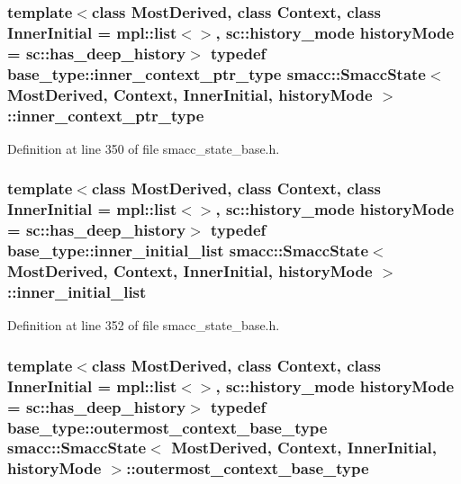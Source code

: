\subsubsection[{\texorpdfstring{inner\+\_\+context\+\_\+ptr\+\_\+type}{inner_context_ptr_type}}]{\setlength{\rightskip}{0pt plus 5cm}template$<$class Most\+Derived, class Context, class Inner\+Initial = mpl\+::list$<$$>$, sc\+::history\+\_\+mode history\+Mode = sc\+::has\+\_\+deep\+\_\+history$>$ typedef base\+\_\+type\+::inner\+\_\+context\+\_\+ptr\+\_\+type {\bf smacc\+::\+Smacc\+State}$<$ Most\+Derived, Context, Inner\+Initial, history\+Mode $>$\+::{\bf inner\+\_\+context\+\_\+ptr\+\_\+type}}\hypertarget{classsmacc_1_1SmaccState_a65a772c2e2039e9a59148ba6ffb54d8a}{}\label{classsmacc_1_1SmaccState_a65a772c2e2039e9a59148ba6ffb54d8a}


Definition at line 350 of file smacc\+\_\+state\+\_\+base.\+h.

\subsubsection[{\texorpdfstring{inner\+\_\+initial\+\_\+list}{inner_initial_list}}]{\setlength{\rightskip}{0pt plus 5cm}template$<$class Most\+Derived, class Context, class Inner\+Initial = mpl\+::list$<$$>$, sc\+::history\+\_\+mode history\+Mode = sc\+::has\+\_\+deep\+\_\+history$>$ typedef base\+\_\+type\+::inner\+\_\+initial\+\_\+list {\bf smacc\+::\+Smacc\+State}$<$ Most\+Derived, Context, Inner\+Initial, history\+Mode $>$\+::{\bf inner\+\_\+initial\+\_\+list}}\hypertarget{classsmacc_1_1SmaccState_acb4ac84bce421d39b594510a6b2df558}{}\label{classsmacc_1_1SmaccState_acb4ac84bce421d39b594510a6b2df558}


Definition at line 352 of file smacc\+\_\+state\+\_\+base.\+h.

\subsubsection[{\texorpdfstring{outermost\+\_\+context\+\_\+base\+\_\+type}{outermost_context_base_type}}]{\setlength{\rightskip}{0pt plus 5cm}template$<$class Most\+Derived, class Context, class Inner\+Initial = mpl\+::list$<$$>$, sc\+::history\+\_\+mode history\+Mode = sc\+::has\+\_\+deep\+\_\+history$>$ typedef base\+\_\+type\+::outermost\+\_\+context\+\_\+base\+\_\+type {\bf smacc\+::\+Smacc\+State}$<$ Most\+Derived, Context, Inner\+Initial, history\+Mode $>$\+::{\bf outermost\+\_\+context\+\_\+base\+\_\+type}}\hypertarget{classsmacc_1_1SmaccState_aaf76bbe2aa9dd73e3284605f84ab4b16}{}\label{classsmacc_1_1SmaccState_aaf76bbe2aa9dd73e3284605f84ab4b16}


